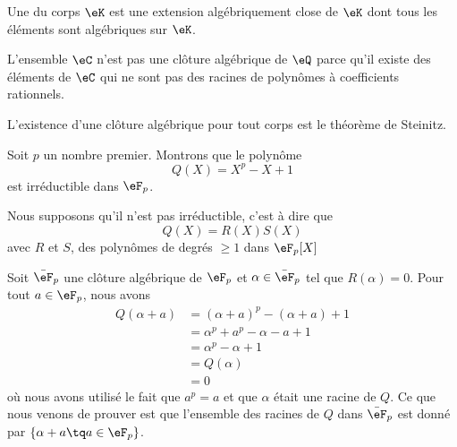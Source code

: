 Une  du corps \( \eK\) est une extension algébriquement close de \( \eK\) dont tous les éléments sont algébriques sur \( \eK\).

\begin{remark}
    L'ensemble \( \eC\) n'est pas une clôture algébrique de \( \eQ\) parce qu'il existe des éléments de \( \eC\) qui ne sont pas des racines de polynômes à coefficients rationnels.
\end{remark}
L'existence d'une clôture algébrique pour tout corps est le théorème de Steinitz.

\begin{example}     \label{ExfUqQXQ}
    Soit \( p\) un nombre premier. Montrons que le polynôme 
    \begin{equation}
        Q(X)=X^p-X+1
    \end{equation}
    est irréductible dans \( \eF_p\). 

    Nous supposons qu'il n'est pas irréductible, c'est à dire que
    \begin{equation}
        Q(X)=R(X)S(X)
    \end{equation}
    avec \( R\) et \( S\), des polynômes de degrés \( \geq 1\) dans \( \eF_p[X]\)

    Soit \( \bar\eF_p\) une clôture algébrique de \( \eF_p\) et \( \alpha\in \bar \eF_p\) tel que \( R(\alpha)=0\). Pour tout \( a\in \eF_p\), nous avons
    \begin{subequations}
        \begin{align}
            Q(\alpha+a)&=(\alpha+a)^p-(\alpha+a)+1\\
            &=\alpha^p+a^p-\alpha-a+1\\
            &=\alpha^p-\alpha+1\\
            &=Q(\alpha)\\
            &=0
        \end{align}
    \end{subequations}
    où nous avons utilisé le fait que \( a^p=a\) et que \( \alpha\) était une racine de \( Q\). Ce que nous venons de prouver est que l'ensemble des racines de \( Q\) dans \( \bar\eF_p\) est donné par \( \{ \alpha+a\tq a\in \eF_p \}\).


\end{example}
